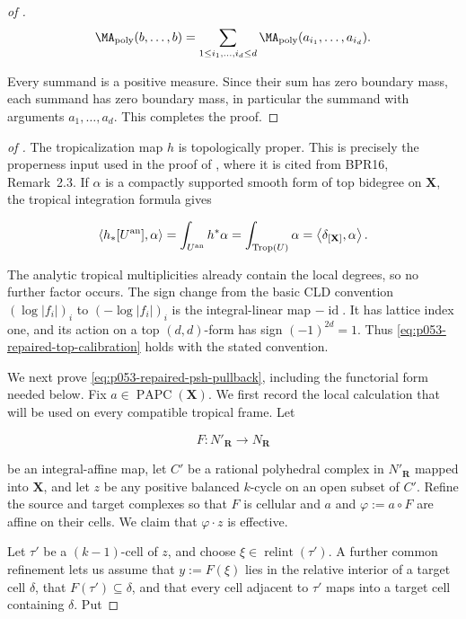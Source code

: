 \begin{proof}[of
]
\begin{equation}
 \MA_{\mathrm{poly}}(b,\ldots,b)
 =\sum_{1\leq i_1,\ldots,i_d\leq d}
   \MA_{\mathrm{poly}}(a_{i_1},\ldots,a_{i_d}).
 \label{eq:p053-repaired-mixed-boundary-expansion}
\end{equation}

Every summand is a positive measure.  Since their sum has zero boundary
mass, each summand has zero boundary mass, in particular the summand with
arguments \(a_1,\ldots,a_d\).  This completes the proof.
\end{proof}

\begin{proof}[of
]
The tropicalization map \(h\) is topologically proper.  This is precisely
the properness input used in the proof of \cite[Proposition~4.21]{GK17},
where it is cited from BPR16, Remark~2.3.  If \(\alpha\) is a compactly
supported smooth form of top bidegree on \(\mathbf X\), the tropical
integration formula \cite[Definition~5.8]{GK17} gives

\[
 \left\langle h_*[U^{\mathrm{an}}],\alpha\right\rangle
 =\int_{U^{\mathrm{an}}}h^*\alpha
 =\int_{\operatorname{Trop}(U)}\alpha
 =\left\langle\delta_{[\mathbf X]},\alpha\right\rangle.
\]

The analytic tropical multiplicities already contain the local degrees, so
no further factor occurs.  The sign change from the basic CLD convention
\((\log|f_i|)_i\) to \(( -\log|f_i|)_i\) is the integral-linear map
\(-\operatorname{id}\).  It has lattice index one, and its action on a top
\((d,d)\)-form has sign \((-1)^{2d}=1\).  Thus
\eqref{eq:p053-repaired-top-calibration} holds with the stated convention.

We next prove \eqref{eq:p053-repaired-psh-pullback}, including the
functorial form needed below.  Fix
\(a\in\operatorname{PAPC}(\mathbf X)\).  We first record the local
calculation that will be used on every compatible tropical frame.  Let

\[
 F:N'_{\mathbf R}\longrightarrow N_{\mathbf R}
\]

be an integral-affine map, let \(C'\) be a rational polyhedral complex in
\(N'_{\mathbf R}\) mapped into \(\mathbf X\), and let \(z\) be any positive
balanced \(k\)-cycle on an open subset of \(C'\).  Refine the source and
target complexes so that \(F\) is cellular and \(a\) and
\(\varphi:=a\circ F\) are affine on their cells.  We claim that
\(\varphi\cdot z\) is effective.

Let \(\tau'\) be a \((k-1)\)-cell of \(z\), and choose
\(\xi\in\operatorname{relint}(\tau')\).  A further common refinement lets
us assume that \(y:=F(\xi)\) lies in the relative interior of a target cell
\(\delta\), that \(F(\tau')\subseteq\delta\), and that every cell adjacent
to \(\tau'\) maps into a target cell containing \(\delta\).  Put


\end{proof}
